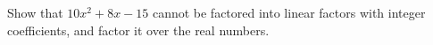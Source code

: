 Show that $10x^2+8x-15$ cannot be factored into linear factors with integer coefficients, and factor it over the real numbers.
